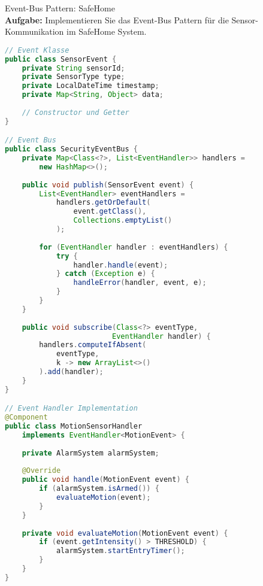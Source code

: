 \begin{example2}{Event-Bus Pattern: SafeHome}\\
\textbf{Aufgabe:} Implementieren Sie das Event-Bus Pattern für die Sensor-Kommunikation im SafeHome System.

\begin{lstlisting}[language=Java, style=basesmol]
// Event Klasse
public class SensorEvent {
    private String sensorId;
    private SensorType type;
    private LocalDateTime timestamp;
    private Map<String, Object> data;
    
    // Constructor und Getter
}

// Event Bus
public class SecurityEventBus {
    private Map<Class<?>, List<EventHandler>> handlers = 
        new HashMap<>();
    
    public void publish(SensorEvent event) {
        List<EventHandler> eventHandlers = 
            handlers.getOrDefault(
                event.getClass(), 
                Collections.emptyList()
            );
        
        for (EventHandler handler : eventHandlers) {
            try {
                handler.handle(event);
            } catch (Exception e) {
                handleError(handler, event, e);
            }
        }
    }
    
    public void subscribe(Class<?> eventType, 
                         EventHandler handler) {
        handlers.computeIfAbsent(
            eventType, 
            k -> new ArrayList<>()
        ).add(handler);
    }
}

// Event Handler Implementation
@Component
public class MotionSensorHandler 
    implements EventHandler<MotionEvent> {
    
    private AlarmSystem alarmSystem;
    
    @Override
    public void handle(MotionEvent event) {
        if (alarmSystem.isArmed()) {
            evaluateMotion(event);
        }
    }
    
    private void evaluateMotion(MotionEvent event) {
        if (event.getIntensity() > THRESHOLD) {
            alarmSystem.startEntryTimer();
        }
    }
}
\end{lstlisting}
\end{example2}

